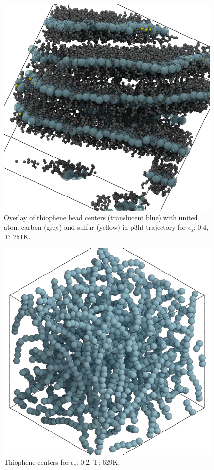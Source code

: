 \begin{figure}
    \centering
    \includegraphics[width=0.8\linewidth]{figures/p3ht_val/cg-overlay_scene.png}
    \caption{Overlay of thiophene bead centers (translucent blue) with united atom carbon (grey) and sulfur (yellow) in p3ht trajectory for $\epsilon_{s}$: 0.4, T: 251K. }\label{centers-overlay}
\end{figure}


\begin{figure}
    \centering
    \includegraphics[width=0.8\linewidth]{figures/p3ht_val/cg-trajectory-amorphous_scene.png}
    \caption{Thiophene centers for $\epsilon_{s}$: 0.2, T: 629K.}\label{loworder-centers}
\end{figure}


